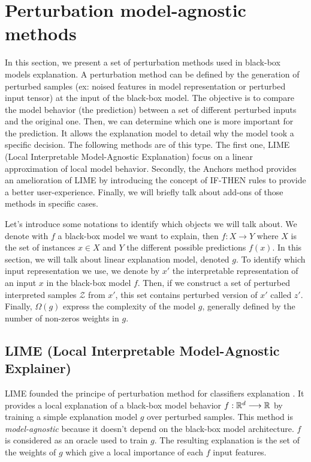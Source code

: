 \section{Perturbation model-agnostic methods}

In this section, we present a set of perturbation methods used in black-box 
models explanation. A perturbation method can be defined by the 
generation of perturbed samples (ex: noised features in model representation
or perturbed input tensor) at the input of the black-box model. The objective 
is to compare the model behavior (the prediction) between a set of different 
perturbed inputs and the original one. Then, we can determine 
which one is more important for the prediction. It allows the explanation model to 
detail why the model took a specific decision. The following methods are of this 
type. The first one, LIME (Local Interpretable Model-Agnostic Explanation) focus on a linear approximation 
of local model behavior. Secondly, the Anchors method provides an amelioration of LIME by introducing the concept 
of IF-THEN rules to provide a better user-experience. Finally, we will briefly talk about add-ons of those methods
in specific cases. 

\begin{remark}[Notation]
    Let's introduce some notations to identify which objects we will talk about. 
    We denote with $f$ a black-box model we want to explain, then $f : X \longrightarrow Y$ 
    where $X$ is the set of instances $x \in X$ and $Y$ the different possible predictions $f(x)$. 
    In this section, we will talk about linear explanation model, denoted $g$. 
    To identify which input representation we use, we denote by $x'$ the 
    interpretable representation of an input $x$ in the black-box model $f$. 
    Then, if we construct a set of perturbed interpreted samples $ \mathcal{Z}$ 
    from $x'$, this set contains perturbed version of $x'$ called $z'$. Finally, 
    $ \Omega(g)$ express the complexity of the model $g$, generally defined by the 
    number of non-zeros weights in $g$. 
\end{remark}

\subsection{LIME (Local Interpretable Model-Agnostic Explainer)}



LIME founded the principe of perturbation method for classifiers explanation \cite{ribeiro_why_2016}. 
It provides a local explanation of a black-box model behavior 
$ f : \mathbb{R}^d \longrightarrow \mathbb{R} $ by training a simple explanation 
model $g$ over perturbed samples. This method 
is \emph{model-agnostic} because it doesn't depend on the black-box model 
architecture. $f$ is considered as an oracle used to train $g$. The resulting explanation is the 
set of the weights of $g$ which give a local importance of each $f$ input features. 

